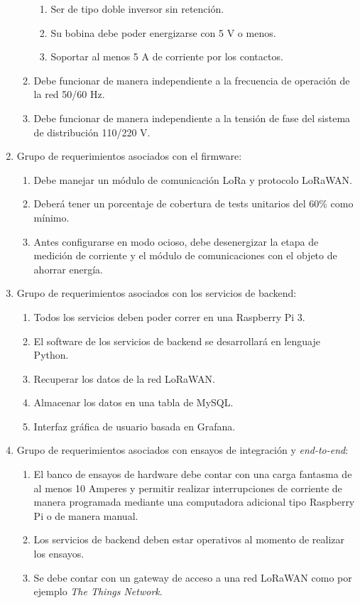 \begin{enumerate}
\begin{enumerate}
\begin{enumerate}
			\item Ser de tipo doble inversor sin retención.
			\item Su bobina debe poder energizarse con 5 V o menos.
			\item Soportar al menos 5 A de corriente por los contactos.
		\end{enumerate} 
		\item Debe funcionar de manera independiente a la frecuencia de operación de la red 50/60 Hz.
		\item Debe funcionar de manera independiente a la tensión de fase del sistema de distribución 110/220 V.
	\end{enumerate}
	\item Grupo de requerimientos asociados con el firmware:
	\begin{enumerate}
		\item Debe manejar un módulo de comunicación LoRa y protocolo LoRaWAN.
		\item Deberá tener un porcentaje de cobertura de tests unitarios del 60\% como mínimo.
		\item Antes configurarse en modo ocioso, debe desenergizar la etapa de medición de corriente y el módulo de comunicaciones con el objeto de ahorrar energía.
	\end{enumerate}
	
	\item Grupo de requerimientos asociados con los servicios de backend:
	\label{requerimientos_backend}
	\begin{enumerate}
		\item Todos los servicios deben poder correr en una Raspberry Pi 3.
		\item El software de los servicios de backend se desarrollará en lenguaje Python.
		\item Recuperar los datos de la red LoRaWAN.\label{requerimiento_LORAWAN}
		\item Almacenar los datos en una tabla de MySQL.
		\item Interfaz gr\'{a}fica de usuario basada en Grafana.
	\end{enumerate}
	
	\item Grupo de requerimientos asociados con ensayos de integración y \textit{end-to-end}:
	\begin{enumerate}
		\item El banco de ensayos de hardware debe contar con una carga fantasma de al menos 10 Amperes y permitir realizar interrupciones de corriente de manera programada mediante una computadora adicional tipo Raspberry Pi o de manera manual.
		\item Los servicios de backend deben estar operativos al momento de realizar los ensayos.
		\item Se debe contar con un gateway de acceso a una red LoRaWAN como por ejemplo \textit{The Things Network}.
	\end{enumerate}
\end{enumerate}


